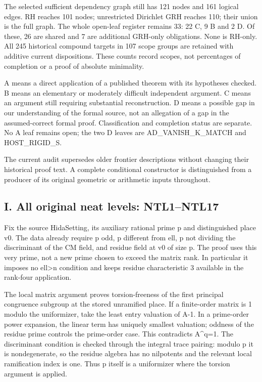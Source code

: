 The selected sufficient dependency graph still has 121 nodes and 161 logical edges. RH reaches 101 nodes; unrestricted Dirichlet GRH reaches 110; their union is the full graph. The whole open-leaf register remains 33: 22 C, 9 B and 2 D. Of these, 26 are shared and 7 are additional GRH-only obligations. None is RH-only. All 245 historical compound targets in 107 scope groups are retained with additive current dispositions. These counts record scopes, not percentages of completion or a proof of absolute minimality.

A means a direct application of a published theorem with its hypotheses checked. B means an elementary or moderately difficult independent argument. C means an argument still requiring substantial reconstruction. D means a possible gap in our understanding of the formal source, not an allegation of a gap in the assumed-correct formal proof. Classification and completion status are separate. No A leaf remains open; the two D leaves are AD\_\allowbreak{}VANISH\_\allowbreak{}K\_\allowbreak{}MATCH and HOST\_\allowbreak{}RIGID\_\allowbreak{}S.

The current audit supersedes older frontier descriptions without changing their historical proof text. A complete conditional constructor is distinguished from a producer of its original geometric or arithmetic inputs throughout.

\subsection{I. All original neat levels: NTL1–NTL17}

Fix the source HidaSetting, its auxiliary rational prime p and distinguished place v0. The data already require p odd, p different from ell, p not dividing the discriminant of the CM field, and residue field at v0 of size p. The proof uses this very prime, not a new prime chosen to exceed the matrix rank. In particular it imposes no ell>n condition and keeps residue characteristic 3 available in the rank-four application.

The local matrix argument proves torsion-freeness of the first principal congruence subgroup at the stored unramified place. If a finite-order matrix is 1 modulo the uniformizer, take the least entry valuation of A-1. In a prime-order power expansion, the linear term has uniquely smallest valuation; oddness of the residue prime controls the prime-order case. This contradicts A\textasciicircum{}q=1. The discriminant condition is checked through the integral trace pairing: modulo p it is nondegenerate, so the residue algebra has no nilpotents and the relevant local ramification index is one. Thus p itself is a uniformizer where the torsion argument is applied.

